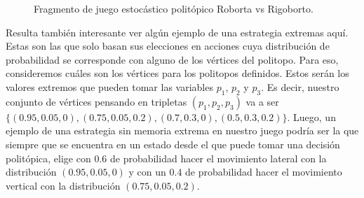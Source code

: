 \begin{figure}[ht]
	\caption{Fragmento de juego estocástico politópico Roborta vs Rigoborto.}
	\label{fig:psg}
\end{figure}

Resulta también interesante ver algún ejemplo de una estrategia extremas aquí.
Estas son las que solo basan sus elecciones en acciones cuya distribución de
probabilidad se corresponde con alguno de los vértices del politopo. Para eso,
consideremos cuáles son los vértices para los politopos definidos. Estos serán
los valores extremos que pueden tomar las variables $p_1$, $p_2$ y $p_3$. Es
decir, nuestro conjunto de vértices pensando en tripletas $(p_1, p_2, p_3)$ va
a ser $\{(0.95, 0.05, 0), (0.75, 0.05, 0.2), (0.7, 0.3, 0), (0.5, 0.3, 0.2)\}$.
Luego, un ejemplo de una estrategia sin memoria extrema en nuestro juego podría
ser la que siempre que se encuentra en un estado desde el que puede tomar una
decisión politópica, elige con $0.6$ de probabilidad hacer el movimiento
lateral con la distribución $(0.95, 0.05, 0)$ y con un $0.4$ de probabilidad
hacer el movimiento vertical con la distribución $(0.75, 0.05, 0.2)$.

